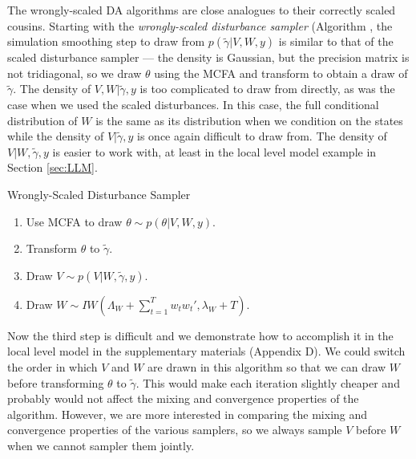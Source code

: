 \documentclass[12pt]{article}
\begin{document}
The wrongly-scaled DA algorithms are close analogues to their correctly scaled cousins. Starting with the {\it wrongly-scaled disturbance sampler} (Algorithm , the simulation smoothing step to draw from $p(\tilde{\gamma}|V,W,y)$ is similar to that of the scaled disturbance sampler --- the density is Gaussian, but the precision matrix is not tridiagonal, so we draw $\theta$ using the MCFA and transform to obtain a draw of $\tilde{\gamma}$. The density of $V,W|\tilde{\gamma},y$ is too complicated to draw from directly, as was the case when we used the scaled disturbances. In this case, the full conditional distribution of $W$ is the same as its distribution when we condition on the states while the density of $V|\tilde{\gamma},y$ is once again difficult to draw from. The density of $V|W,\tilde{\gamma},y$ is easier to work with, at least in the local level model example in Section \ref{sec:LLM}. 
\begin{alg*}[WSD]Wrongly-Scaled Disturbance Sampler\label{alg:DLMwdist}
\begin{enumerate}
\item Use MCFA to draw $\theta \sim p(\theta|V,W,y)$.
\item Transform $\theta$ to $\tilde{\gamma}$.
\item Draw $V \sim p(V|W,\tilde{\gamma},y)$.
\item Draw $W \sim IW\left(\Lambda_W + \sum_{t=1}^Tw_tw_t',\lambda_{W} + T\right)$.
\end{enumerate}
\end{alg*}\noindent
Now the third step is difficult and we demonstrate how to accomplish it in the local level model in the supplementary materials (Appendix D). We could switch the order in which $V$ and $W$ are drawn in this algorithm so that we can draw $W$ before transforming $\theta$ to $\tilde{\gamma}$. This would make each iteration slightly cheaper and probably would not affect the mixing and convergence properties of the algorithm. However, we are more interested in comparing the mixing and convergence properties of the various samplers, so we always sample $V$ before $W$ when we cannot sampler them jointly.
\end{document}
